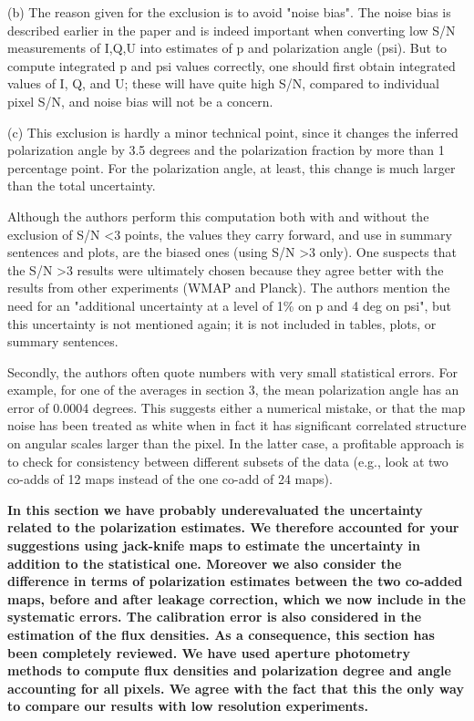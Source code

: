 \documentclass[12pt]{article}
\begin{document}
\begin{enumerate}
(b) The reason given for the exclusion is to avoid "noise bias". The
noise bias is described earlier in the paper and is indeed important
when converting low S/N measurements of I,Q,U into estimates of p and
polarization angle (psi). But to compute integrated p and psi values
correctly, one should first obtain integrated values of I, Q, and U;
these will have quite high S/N, compared to individual pixel S/N, and
noise bias will not be a concern.

(c) This exclusion is hardly a minor technical point, since it changes
the inferred polarization angle by 3.5 degrees and the polarization
fraction by more than 1 percentage point. For the polarization angle,
at least, this change is much larger than the total uncertainty.

Although the authors perform this computation both with and without
the exclusion of S/N \textless 3 points, the values they carry forward, and
use in summary sentences and plots, are the biased ones (using S/N \textgreater 3
only). One suspects that the S/N \textgreater 3 results were ultimately chosen
because they agree better with the results from other experiments
(WMAP and Planck). The authors mention the need for an "additional
uncertainty at a level of 1\% on p and 4 deg on psi", but this
uncertainty is not mentioned again; it is not included in tables,
plots, or summary sentences.


Secondly, the authors often quote numbers with very small statistical
errors. For example, for one of the averages in section 3, the mean
polarization angle has an error of 0.0004 degrees. This suggests
either a numerical mistake, or that the map noise has been
treated as white when in fact it has significant correlated structure
on angular scales larger than the pixel. In the latter case, a
profitable approach is to check for consistency between different
subsets of the data (e.g., look at two co-adds of 12 maps instead of
the one co-add of 24 maps).

\textbf{In this section we have probably underevaluated the uncertainty related to the polarization estimates. We therefore accounted for your suggestions using jack-knife maps to estimate the uncertainty in addition to the statistical one. Moreover we also consider the difference in terms of polarization estimates between the two co-added maps, before and after leakage correction, which we now include in the systematic errors. The calibration error is also considered in the estimation of the flux densities. As a consequence, this section has been completely reviewed. We have used aperture photometry methods to compute flux densities and polarization degree and angle accounting for all pixels. We agree with the fact that this the only way to compare our results with low resolution experiments.}


\end{enumerate}
\end{document}
